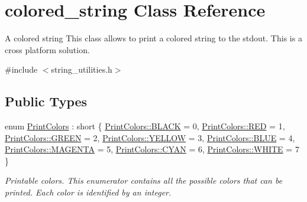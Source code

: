 \hypertarget{classcolored__string}{}\section{colored\+\_\+string Class Reference}
\label{classcolored__string}


A colored string This class allows to print a colored string to the stdout. This is a cross platform solution.  




{\ttfamily \#include $<$string\+\_\+utilities.\+h$>$}

\subsection*{Public Types}
\begin{DoxyCompactItemize}
\item 
enum \mbox{\hyperlink{classcolored__string_a76416a7db18c947e5a6d5bf17c78e497}{Print\+Colors}} \+: short \{ \newline
\mbox{\hyperlink{classcolored__string_a76416a7db18c947e5a6d5bf17c78e497a08d0012388564e95c3b4a7407cf04965}{Print\+Colors\+::\+B\+L\+A\+CK}} = 0, 
\mbox{\hyperlink{classcolored__string_a76416a7db18c947e5a6d5bf17c78e497aa2d9547b5d3dd9f05984475f7c926da0}{Print\+Colors\+::\+R\+ED}} = 1, 
\mbox{\hyperlink{classcolored__string_a76416a7db18c947e5a6d5bf17c78e497a9de0e5dd94e861317e74964bed179fa0}{Print\+Colors\+::\+G\+R\+E\+EN}} = 2, 
\mbox{\hyperlink{classcolored__string_a76416a7db18c947e5a6d5bf17c78e497a8a568e5f41b7e4da88fe5c4a00aad34e}{Print\+Colors\+::\+Y\+E\+L\+L\+OW}} = 3, 
\newline
\mbox{\hyperlink{classcolored__string_a76416a7db18c947e5a6d5bf17c78e497a1b3e1ee9bff86431dea6b181365ba65f}{Print\+Colors\+::\+B\+L\+UE}} = 4, 
\mbox{\hyperlink{classcolored__string_a76416a7db18c947e5a6d5bf17c78e497ac634ffea7195608364671ac52ee59a61}{Print\+Colors\+::\+M\+A\+G\+E\+N\+TA}} = 5, 
\mbox{\hyperlink{classcolored__string_a76416a7db18c947e5a6d5bf17c78e497a344dd8cd533280795b9db82ef0c92749}{Print\+Colors\+::\+C\+Y\+AN}} = 6, 
\mbox{\hyperlink{classcolored__string_a76416a7db18c947e5a6d5bf17c78e497ab5bf627e448384cf3a4c35121ca6008d}{Print\+Colors\+::\+W\+H\+I\+TE}} = 7
 \}
\begin{DoxyCompactList}\small\item\em Printable colors. This enumerator contains all the possible colors that can be printed. Each color is identified by an integer. \end{DoxyCompactList}\end{DoxyCompactItemize}
